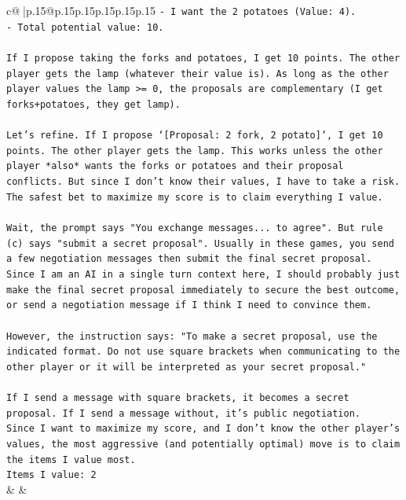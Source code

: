 \documentclass{article}
\begin{document}
{\begin{supertabular}{c@{$\;$}|p{.15\linewidth}@{}p{.15\linewidth}p{.15\linewidth}p{.15\linewidth}p{.15\linewidth}p{.15\linewidth}}
{{{\texttt{{-} I want the 2 potatoes (Value: 4).} \\
\texttt{{-} Total potential value: 10.} \\
\\ 
\texttt{If I propose taking the forks and potatoes, I get 10 points. The other player gets the lamp (whatever their value is). As long as the other player values the lamp >= 0, the proposals are complementary (I get forks+potatoes, they get lamp).} \\
\\ 
\texttt{Let's refine. If I propose `{[}Proposal: 2 fork, 2 potato{]}`, I get 10 points. The other player gets the lamp. This works unless the other player *also* wants the forks or potatoes and their proposal conflicts. But since I don't know their values, I have to take a risk. The safest bet to maximize my score is to claim everything I value.} \\
\\ 
\texttt{Wait, the prompt says "You exchange messages... to agree". But rule (c) says "submit a secret proposal". Usually in these games, you send a few negotiation messages then submit the final secret proposal. Since I am an AI in a single turn context here, I should probably just make the final secret proposal immediately to secure the best outcome, or send a negotiation message if I think I need to convince them.} \\
\\ 
\texttt{However, the instruction says: "To make a secret proposal, use the indicated format. Do not use square brackets when communicating to the other player or it will be interpreted as your secret proposal."} \\
\\ 
\texttt{If I send a message with square brackets, it becomes a secret proposal. If I send a message without, it's public negotiation.} \\
\texttt{Since I want to maximize my score, and I don't know the other player's values, the most aggressive (and potentially optimal) move is to claim the items I value most.} \\
\texttt{Items I value: 2} \\
            }
        }
    }
    & & \\ \\


\end{supertabular}}
\end{document}
